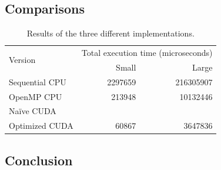\documentclass[12pt, oneside]{article}
\begin{document}
\subsection{Comparisons}
\begin{table}[h]
\centering
\begin{tabular}{l r r}
\toprule
\multirow{2}{*}{Version}	& \multicolumn{2}{c}{Total execution time (microseconds)} \\
					& Small		& Large \\				
\midrule
Sequential CPU		& 2297659	& 216305907 \\
OpenMP CPU			& 213948		& 10132446 \\
Na\"ive CUDA			& &\\
Optimized CUDA		& 60867		& 3647836 \\
\bottomrule
\end{tabular}
\caption{\label{fig:results} Results of the three different implementations.}
\end{table}
\subsection{Conclusion}


\end{document}
